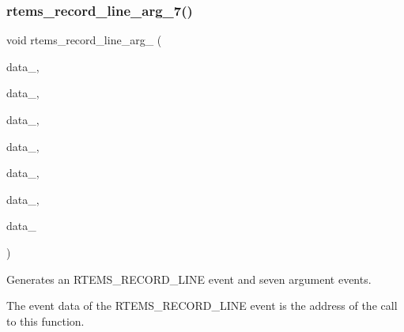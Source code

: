 \subsubsection{\texorpdfstring{rtems\_record\_line\_arg\_7()}{rtems\_record\_line\_arg\_7()}}
{\footnotesize\ttfamily void rtems\+\_\+record\+\_\+line\+\_\+arg\+\_ (\begin{DoxyParamCaption}\item[{\mbox{\hyperlink{group__RTEMSRecord_gab483bd3ec735835dac6788b78c817eab}{rtems\+\_\+record\+\_\+data}}}]{data\+\_,  }\item[{\mbox{\hyperlink{group__RTEMSRecord_gab483bd3ec735835dac6788b78c817eab}{rtems\+\_\+record\+\_\+data}}}]{data\+\_,  }\item[{\mbox{\hyperlink{group__RTEMSRecord_gab483bd3ec735835dac6788b78c817eab}{rtems\+\_\+record\+\_\+data}}}]{data\+\_,  }\item[{\mbox{\hyperlink{group__RTEMSRecord_gab483bd3ec735835dac6788b78c817eab}{rtems\+\_\+record\+\_\+data}}}]{data\+\_,  }\item[{\mbox{\hyperlink{group__RTEMSRecord_gab483bd3ec735835dac6788b78c817eab}{rtems\+\_\+record\+\_\+data}}}]{data\+\_,  }\item[{\mbox{\hyperlink{group__RTEMSRecord_gab483bd3ec735835dac6788b78c817eab}{rtems\+\_\+record\+\_\+data}}}]{data\+\_,  }\item[{\mbox{\hyperlink{group__RTEMSRecord_gab483bd3ec735835dac6788b78c817eab}{rtems\+\_\+record\+\_\+data}}}]{data\+\_ }\end{DoxyParamCaption})}



Generates an R\+T\+E\+M\+S\+\_\+\+R\+E\+C\+O\+R\+D\+\_\+\+L\+I\+NE event and seven argument events. 

The event data of the R\+T\+E\+M\+S\+\_\+\+R\+E\+C\+O\+R\+D\+\_\+\+L\+I\+NE event is the address of the call to this function.


